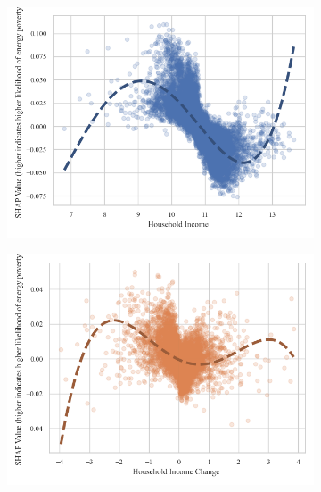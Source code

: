 \documentclass[preprint,authoryear,12pt]{elsarticle}
\begin{document}
\begin{figure}
     \centering
     \begin{subfigure}[b]{0.45\textwidth}
         \centering
         \includegraphics[width=\textwidth]{Figure4a.png}
     \end{subfigure}
     \hfill
     \begin{subfigure}[b]{0.45\textwidth}
         \centering
         \includegraphics[width=\textwidth]{Figure4b.png}
     \end{subfigure}
     \hfill
     \begin{subfigure}[b]{0.45\textwidth}
         \centering

\end{subfigure}
\end{figure}
\end{document}
